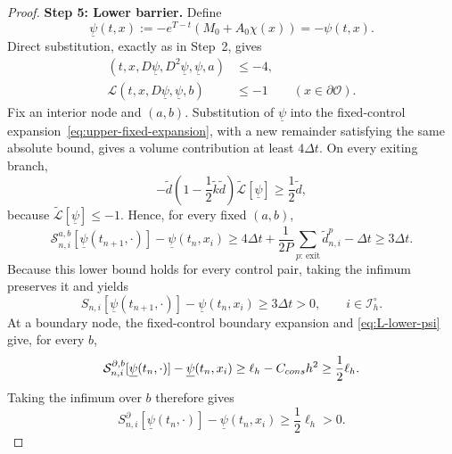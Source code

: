 \documentclass[10pt,a4paper]{amsart}
\newcommand{\cO}{\mathcal{O}}
\newcommand{\cS}{\mathcal{S}}
\begin{document}
\begin{proof}
		\medskip
		\noindent\textbf{Step 5: Lower barrier.}
		Define
		\[
		\underline\psi(t,x):=-e^{T-t}(M_0+A_0\chi(x))=-\psi(t,x).
		\]
		Direct substitution, exactly as in Step~2, gives
		\begin{align}
			[-\partial_t\underline\psi+\mathcal H]
			(t,x,D\underline\psi,D^2\underline\psi,\underline\psi,a)&\le-4,
			\label{eq:H-lower-psi}\\
			\mathcal L(t,x,D\underline\psi,\underline\psi,b)&\le-1
			\qquad(x\in\partial\cO).
			\label{eq:L-lower-psi}
		\end{align}
		Fix an interior node and $(a,b)$.  Substitution of $\underline\psi$ into
		the fixed-control expansion~\eqref{eq:upper-fixed-expansion}, with a new
		remainder satisfying the same absolute bound, gives a volume contribution
		at least $4\Delta t$.  On every exiting branch,
		\[
		-\widetilde d\left(1-\frac12\widetilde k\widetilde d\right)
		\widetilde{\mathcal L}[\underline\psi]
		\ge\frac12\widetilde d,
		\]
		because $\widetilde{\mathcal L}[\underline\psi]\le-1$.  Hence, for every
		fixed $(a,b)$,
		\[
		\cS_{n,i}^{a,b}[\underline\psi(t_{n+1},\cdot)]
		-\underline\psi(t_n,x_i)
		\ge4\Delta t+\frac1{2P}\sum_{p:\,\mathrm{exit}}
		\widetilde d_{n,i}^p-\Delta t
		\ge3\Delta t.
		\]
		Because this lower bound holds for every control pair, taking the infimum
		preserves it and yields
		\begin{equation}
			S_{n,i}[\underline\psi(t_{n+1},\cdot)]
			-\underline\psi(t_n,x_i)\ge3\Delta t>0,
			\qquad i\in\mathcal I_h^\circ.
			\label{eq:S-lower-psi-interior}
		\end{equation}
		At a boundary node, the fixed-control boundary expansion and
		\eqref{eq:L-lower-psi} give, for every $b$,
		\[
		\cS_{n,i}^{\partial,b}[\underline\psi(t_n,\cdot)]
		-\underline\psi(t_n,x_i)
		\ge\ell_h-C_{\rm cons}h^2\ge\frac12\ell_h.
		\]
		Taking the infimum over $b$ therefore gives
		\begin{equation}
			S_{n,i}^{\partial}[\underline\psi(t_n,\cdot)]
			-\underline\psi(t_n,x_i)
			\ge\frac12\ell_h>0.
			\label{eq:S-lower-psi-boundary}
		\end{equation}
		

\end{proof}
\end{document}
